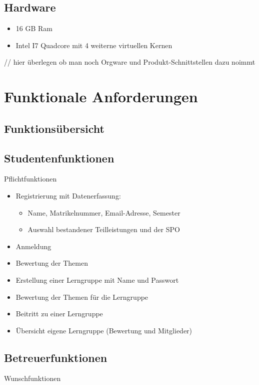 \documentclass[parskip=full]{scrartcl}
\begin{document}
\subsection{Hardware}
\begin{itemize} 
  \item 16 GB Ram
  \item Intel I7 Quadcore mit 4 weiterne virtuellen Kernen 
\end{itemize}
// hier überlegen ob man noch Orgware und Produkt-Schnittstellen dazu noimmt
\section{Funktionale Anforderungen}

\subsection{Funktionsübersicht}

\subsection{Studentenfunktionen}

Pflichtfunktionen

\begin{itemize}
  \item Registrierung mit Datenerfassung:
  \begin{itemize}
    \item Name, Matrikelnummer, Email-Adresse, Semester
    \item Auswahl bestandener Teilleistungen und der SPO
  \end{itemize}
  \item Anmeldung
  \item Bewertung der Themen
  \item Erstellung einer Lerngruppe mit Name und Passwort
  \item Bewertung der Themen für die Lerngruppe
  \item Beitritt zu einer Lerngruppe
  \item Übersicht eigene Lerngruppe (Bewertung und Mitglieder)
\end{itemize}

\subsection{Betreuerfunktionen}

Wunschfunktionen
\end{document}
